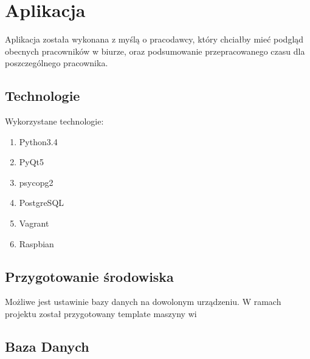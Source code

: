 \chapter{Aplikacja}
Aplikacja została wykonana z myślą o pracodawcy, który chciałby mieć podgląd obecnych pracowników w biurze, oraz podsumowanie przepracowanego czasu dla poszczególnego pracownika.
\section{Technologie}
Wykorzystane technologie:
\begin{enumerate}
\item Python3.4
\item PyQt5
\item psycopg2
\item PostgreSQL
\item Vagrant
\item Raspbian
\end{enumerate}
\section{Przygotowanie środowiska}
Możliwe jest ustawinie bazy danych na dowolonym urządzeniu.
W ramach projektu został przygotowany template maszyny wi
\section{Baza Danych}